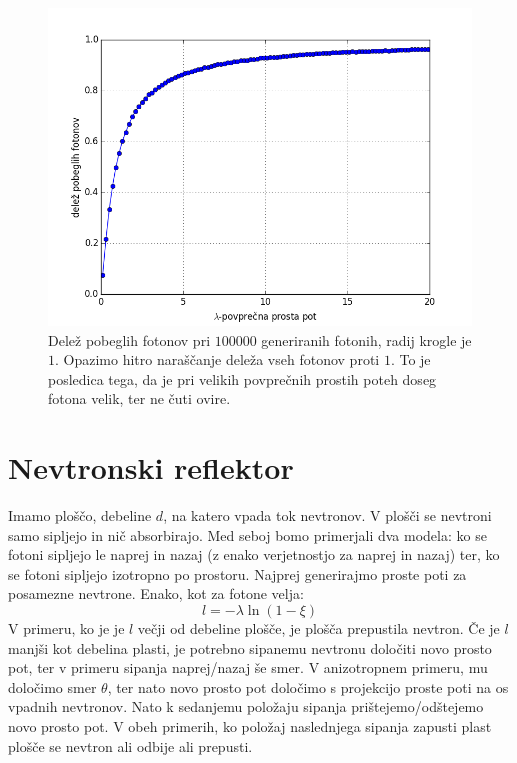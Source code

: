 \documentclass[slovene,11pt,a4paper]{article}
\numberwithin{equation}{section} %
\numberwithin{figure}{section} %
\numberwithin{table}{section} %
\begin{document}
\begin{figure}[h]
\begin{center}

\includegraphics[scale=0.65]{slike/9_druga.png}

\caption{Delež pobeglih fotonov pri $100000$ generiranih fotonih, radij krogle je $1$. Opazimo hitro naraščanje deleža vseh fotonov proti $1$. To je posledica tega, da je pri velikih povprečnih prostih poteh doseg fotona velik, ter ne čuti ovire.}
\end{center}
\end{figure}

\section{Nevtronski reflektor}
Imamo ploščo, debeline $d$, na katero vpada tok  nevtronov. V plošči se nevtroni samo sipljejo in nič absorbirajo. Med seboj bomo primerjali dva modela: ko se fotoni sipljejo le naprej in nazaj (z enako verjetnostjo za naprej in nazaj) ter, ko se fotoni sipljejo izotropno po prostoru.
Najprej generirajmo proste poti za posamezne nevtrone. Enako, kot za fotone velja:
\begin{equation}
l=-\lambda \ln(1-\xi )
\end{equation}
V primeru, ko je je $l$ večji od debeline plošče, je plošča prepustila nevtron. Če je $l$ manjši kot debelina plasti, je potrebno sipanemu nevtronu določiti novo prosto pot, ter v primeru sipanja naprej/nazaj še smer. V anizotropnem primeru, mu določimo smer $\theta$, ter nato novo prosto pot določimo s projekcijo proste poti na os vpadnih nevtronov. Nato k sedanjemu položaju sipanja prištejemo/odštejemo novo prosto pot. V obeh primerih, ko položaj naslednjega sipanja zapusti plast plošče se nevtron ali odbije ali prepusti.
\end{document}
